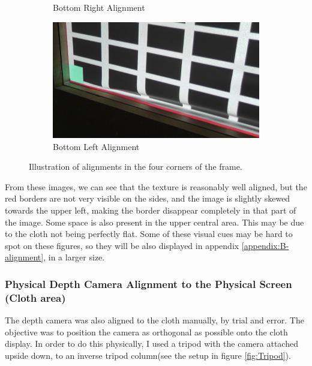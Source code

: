 \documentclass[]{article}
\begin{document}
\begin{figure}[hbtp]
\begin{subfigure}[b]{0.5\linewidth}
    \caption{Bottom Right Alignment} 
    \label{fig7:BRA} 
  \end{subfigure}%
  \begin{subfigure}[b]{0.5\linewidth}
    \centering
    \includegraphics[width=0.75\linewidth]{figures/BottomLeft2.JPG} 
    \caption{Bottom Left Alignment} 
    \label{fig7:BLA} 
  \end{subfigure} 
  \caption{Illustration of alignments in the four corners of the frame.}
  \label{fig:CornerAlignment} 
\end{figure}

 From these images, we can see that the texture is reasonably well aligned, but the red borders are not very visible on the sides, and the image is slightly skewed towards the upper left, making the border disappear completely in that part of the image. Some space is also present in the upper central area. This may be due to the cloth not being perfectly flat. Some of these visual cues may be hard to spot on these figures, so they will be also displayed in appendix \ref{appendix:B-alignment}, in a larger size.

\subsubsection{Physical Depth Camera Alignment to the Physical Screen (Cloth area)}

The depth camera was also aligned to the cloth manually, by trial and error. The objective was to position the camera as orthogonal as possible onto the cloth display. In order to do this physically, I used a tripod with the camera attached upside down, to an inverse tripod column(see the setup in figure \ref{fig:Tripod}). 
\end{document}
